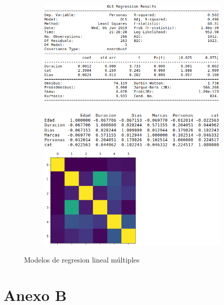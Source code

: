 \documentclass[5p,times]{elsarticle}
\begin{document}
\begin{figure}[H]
\centering
\begin{subfigure}[t]{0.5\textwidth}
\includegraphics[width=\textwidth]{07}
\caption{}
\end{subfigure}

\begin{subfigure}[t]{0.5\textwidth}
\includegraphics[width=\textwidth]{08}
\caption{}
\end{subfigure}

\caption{Modelos de regresion lineal múltiples}\label{fig:MRLMA}
\end{figure}


\section*{Anexo B}\label{AnexoB}
\end{document}
